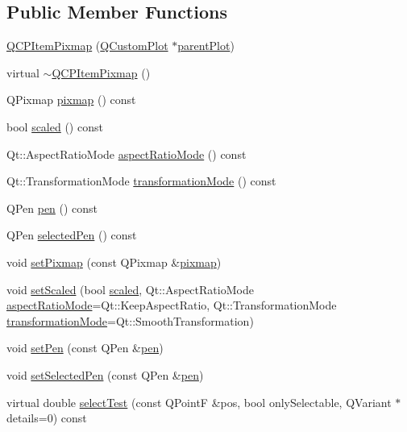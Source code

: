 \subsection*{Public Member Functions}
\begin{DoxyCompactItemize}
\item 
\hyperlink{class_q_c_p_item_pixmap_aa6de42a37261b21a5480e7da122345c3}{Q\+C\+P\+Item\+Pixmap} (\hyperlink{class_q_custom_plot}{Q\+Custom\+Plot} $\ast$\hyperlink{class_q_c_p_layerable_ab7e0e94461566093d36ffc0f5312b109}{parent\+Plot})
\item 
virtual \hyperlink{class_q_c_p_item_pixmap_a810cac6a409d963cda6ea2d3152f1fd0}{$\sim$\+Q\+C\+P\+Item\+Pixmap} ()
\item 
Q\+Pixmap \hyperlink{class_q_c_p_item_pixmap_a73dea89e0eb45127a2705e2c7991b8d8}{pixmap} () const 
\item 
bool \hyperlink{class_q_c_p_item_pixmap_a54026b89dff3c60376c2360f01b6fb83}{scaled} () const 
\item 
Qt\+::\+Aspect\+Ratio\+Mode \hyperlink{class_q_c_p_item_pixmap_ac5b95c097169e107a61eebbb7c77523c}{aspect\+Ratio\+Mode} () const 
\item 
Qt\+::\+Transformation\+Mode \hyperlink{class_q_c_p_item_pixmap_a1d4751a7b9588354fc8e726d891153f7}{transformation\+Mode} () const 
\item 
Q\+Pen \hyperlink{class_q_c_p_item_pixmap_ab2b821c80cfade589472e933b9c4361f}{pen} () const 
\item 
Q\+Pen \hyperlink{class_q_c_p_item_pixmap_af8e839d7c7b84e214608feda3caec2bc}{selected\+Pen} () const 
\item 
void \hyperlink{class_q_c_p_item_pixmap_a726b69ea4025edf48f9b29b6450548a7}{set\+Pixmap} (const Q\+Pixmap \&\hyperlink{class_q_c_p_item_pixmap_a73dea89e0eb45127a2705e2c7991b8d8}{pixmap})
\item 
void \hyperlink{class_q_c_p_item_pixmap_ab4d44529a1c6c8d37d0ea7560e042777}{set\+Scaled} (bool \hyperlink{class_q_c_p_item_pixmap_a54026b89dff3c60376c2360f01b6fb83}{scaled}, Qt\+::\+Aspect\+Ratio\+Mode \hyperlink{class_q_c_p_item_pixmap_ac5b95c097169e107a61eebbb7c77523c}{aspect\+Ratio\+Mode}=Qt\+::\+Keep\+Aspect\+Ratio, Qt\+::\+Transformation\+Mode \hyperlink{class_q_c_p_item_pixmap_a1d4751a7b9588354fc8e726d891153f7}{transformation\+Mode}=Qt\+::\+Smooth\+Transformation)
\item 
void \hyperlink{class_q_c_p_item_pixmap_acdade1305edb4b5cae14f97fd132065f}{set\+Pen} (const Q\+Pen \&\hyperlink{class_q_c_p_item_pixmap_ab2b821c80cfade589472e933b9c4361f}{pen})
\item 
void \hyperlink{class_q_c_p_item_pixmap_afc5e479e88e53740176ce77cb70dd67a}{set\+Selected\+Pen} (const Q\+Pen \&\hyperlink{class_q_c_p_item_pixmap_ab2b821c80cfade589472e933b9c4361f}{pen})
\item 
virtual double \hyperlink{class_q_c_p_item_pixmap_a9f8436aa141fa0fb504191c882c2f4d9}{select\+Test} (const Q\+Point\+F \&pos, bool only\+Selectable, Q\+Variant $\ast$details=0) const 
\end{DoxyCompactItemize}

